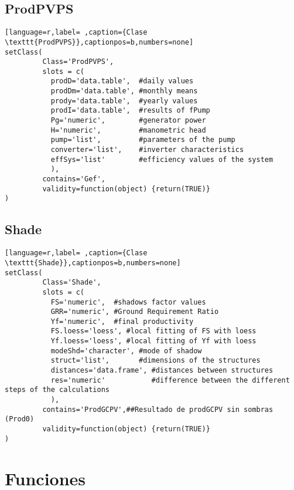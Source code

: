 \subsection{ProdPVPS}
\label{sec:org1146605}
\label{subsec:claseprodpvps}
\begin{lstlisting}[language=r,label= ,caption={Clase \texttt{ProdPVPS}},captionpos=b,numbers=none]
setClass(
         Class='ProdPVPS',
         slots = c(
           prodD='data.table',  #daily values
           prodDm='data.table', #monthly means
           prody='data.table',  #yearly values
           prodI='data.table',  #results of fPump
           Pg='numeric',        #generator power
           H='numeric',         #manometric head
           pump='list',         #parameters of the pump
           converter='list',    #inverter characteristics
           effSys='list'        #efficiency values of the system
           ),
         contains='Gef',
         validity=function(object) {return(TRUE)}
)
\end{lstlisting}
\subsection{Shade}
\label{sec:org1b47f61}
\label{subsec:shade}
\begin{lstlisting}[language=r,label= ,caption={Clase \texttt{Shade}},captionpos=b,numbers=none]
setClass(
         Class='Shade',
         slots = c(
           FS='numeric',  #shadows factor values
           GRR='numeric', #Ground Requirement Ratio
           Yf='numeric',  #final productivity
           FS.loess='loess', #local fitting of FS with loess
           Yf.loess='loess', #local fitting of Yf with loess
           modeShd='character', #mode of shadow
           struct='list',       #dimensions of the structures
           distances='data.frame', #distances between structures
           res='numeric'           #difference between the different steps of the calculations
           ),
         contains='ProdGCPV',##Resultado de prodGCPV sin sombras (Prod0)
         validity=function(object) {return(TRUE)}
)
\end{lstlisting}
\section{Funciones}
\label{sec:org8694f41}
\label{sec:funciones}
